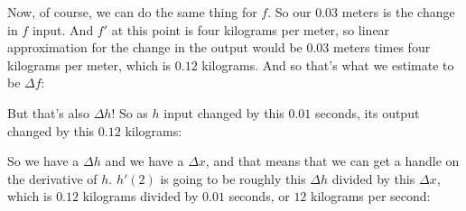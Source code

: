 \documentclass[pdftex, brazil, 12pt, twoside]{article}
\begin{document}
Now, of course, we can do the same thing for $f$.
So our $0.03$ meters is the change in $f$ input.
And $f'$ at this point is four kilograms per meter,
so linear approximation for the change in the output
would be $0.03$ meters times four kilograms per meter,
which is $0.12$ kilograms.
And so that's what we estimate to be $\Delta f$:

\begin{figure}[H]
  \begin{center}
  \end{center}
\end{figure}

But that's also $\Delta h$!
So as $h$ input changed by this $0.01$ seconds,
its output changed by this $0.12$ kilograms:

\begin{figure}[H]
  \begin{center}
  \end{center}
\end{figure}

So we have a $\Delta h$ and we have a $\Delta x$,
and that means that we can get a handle on the derivative of $h$.
$h'(2)$ is going to be roughly this $\Delta h$ divided
by this $\Delta x$, which is $0.12$ kilograms
divided by $0.01$ seconds, or $12$ kilograms per second:
\end{document}
